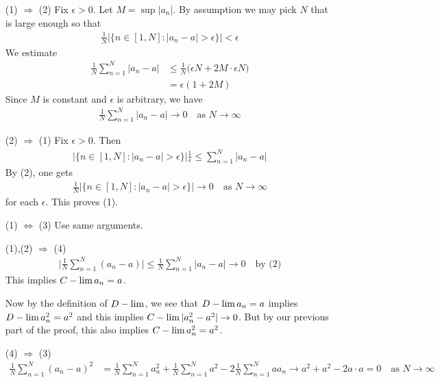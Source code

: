 \documentclass[12pt,a4paper]{report}
\newenvironment{proof}
{\begin{changemargin}{1cm}{0.5cm} 
	}%
	{\end{changemargin}
}
\begin{document}
\begin{proof}
\pf \begin{itemize}
\item[(1) $\Rightarrow$ (2)] Fix $\epsilon >0$. Let $M = \sup |a_n|$. By assumption we may pick $N$ that is large enough so that
\begin{align*}
\frac{1}{N} \big| \{n\in [1,N] : |a_n -a| >\epsilon \} \big| < \epsilon
\end{align*}
We estimate
\begin{align*}
\frac{1}{N} \sum_{n=1}^N |a_n -a| &\leq \frac{1}{N} \Big( \epsilon N + 2M \cdot \epsilon N \Big)\\
&= \epsilon (1+2M)
\end{align*}
Since $M$ is constant and $\epsilon$ is arbitrary, we have
\begin{align*}
\frac{1}{N} \sum_{n=1}^N |a_n -a| \rightarrow 0 \quad \text{as } N\rightarrow \infty
\end{align*}
\item[(2) $\Rightarrow$ (1)] Fix $\epsilon >0$. Then \begin{align*}
\Big| \{n \in [1,N] : |a_n -a| > \epsilon  \} \Big| \frac{1}{\epsilon}\leq \sum_{n=1}^N |a_n-a|
\end{align*}
By (2), one gets
\begin{align*}
\frac{1}{N}|\{n\in [1,N] : |a_n -a| >\epsilon \}| \rightarrow 0 \quad \text{as } N\rightarrow \infty
\end{align*}
for each $\epsilon$. This proves (1).
\item[(1) $\Leftrightarrow$ (3)] Use same arguments. 
\item[(1),(2) $\Rightarrow$ (4)] \begin{align*}
\Big| \frac{1}{N} \sum_{n=1}^N (a_n -a) \Big| \leq \frac{1}{N}\sum_{n=1}^N |a_n -a| \rightarrow 0 \quad \text{by (2)}
\end{align*}
This implies $C-\lim a_n =a$.

\quad Now by the definition of $D-\lim$, we see that $D-\lim a_n = a$ implies $D-\lim a^2_n =a^2$ and this implies $C-\lim |a_n^2 -a^2| \rightarrow 0$. But by our previous part of the proof, this also implies $C-\lim a_n^2 =a^2$.
\item[(4) $\Rightarrow$ (3)] \begin{align*}
\frac{1}{N} \sum_{n=1}^N (a_n -a)^2 &= \frac{1}{N} \sum_{n=1}^N a^2_n + \frac{1}{N} \sum_{n=1}^N a^2 - 2\frac{1}{N}\sum_{n=1}^N a a_n \rightarrow a^2 + a^2 - 2a \cdot a =0 \quad \text{as } N\rightarrow \infty
\end{align*}
\end{itemize}

\eop
\end{proof}
\s
\end{document}
